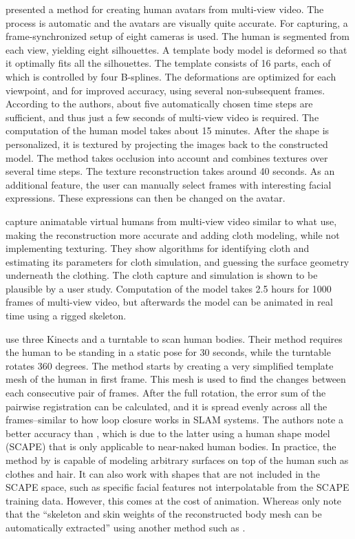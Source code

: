 \citep{schneider2010fitting}

\citet{ahmed2005automatic} presented a method for creating human avatars from multi-view video. The process is automatic and the avatars are visually quite accurate. For capturing, a frame-synchronized setup of eight cameras is used. The human is segmented from each view, yielding eight silhouettes. A template body model is deformed so that it optimally fits all the silhouettes. The template consists of 16 parts, each of which is controlled by four B-splines. The deformations are optimized for each viewpoint, and for improved accuracy, using several non-subsequent frames. According to the authors, about five automatically chosen time steps are sufficient, and thus just a few seconds of multi-view video is required. The computation of the human model takes about 15 minutes. After the shape is personalized, it is textured by projecting the images back to the constructed model. The method takes occlusion into account and combines textures over several time steps. The texture reconstruction takes around 40 seconds. As an additional feature, the user can manually select frames with interesting facial expressions. These expressions can then be changed on the avatar. \citep{ahmed2005automatic}

\citet{stoll2010video} capture animatable virtual humans from multi-view video similar to what \citet{ahmed2005automatic} use, making the reconstruction more accurate and adding cloth modeling, while not implementing texturing. They show algorithms for identifying cloth and estimating its parameters for cloth simulation, and guessing the surface geometry underneath the clothing. The cloth capture and simulation is shown to be plausible by a user study. Computation of the model takes 2.5 hours for 1000 frames of multi-view video, but afterwards the model can be animated in real time using a rigged skeleton. \citep{stoll2010video}

\citet{tongscanning} use three Kinects and a turntable to scan human bodies. Their method requires the human to be standing in a static pose for 30 seconds, while the turntable rotates 360 degrees. The method starts by creating a very simplified template mesh of the human in first frame. This mesh is used to find the changes between each consecutive pair of frames. After the full rotation, the error sum of the pairwise registration can be calculated, and it is spread evenly across all the frames--similar to how loop closure works in SLAM systems. The authors note a better accuracy than \citep{weiss2011home}, which is due to the latter using a human shape model (SCAPE) that is only applicable to near-naked human bodies. In practice, the method by \citeauthor{tongscanning} is capable of modeling arbitrary surfaces on top of the human such as clothes and hair. It can also work with shapes that are not included in the SCAPE space, such as specific facial features not interpolatable from the SCAPE training data. However, this comes at the cost of animation. Whereas  \citet{tongscanning} only note that the ``skeleton and skin weights of the reconstructed body mesh can be automatically extracted'' using another method such as \citep{baran2007automatic}.

